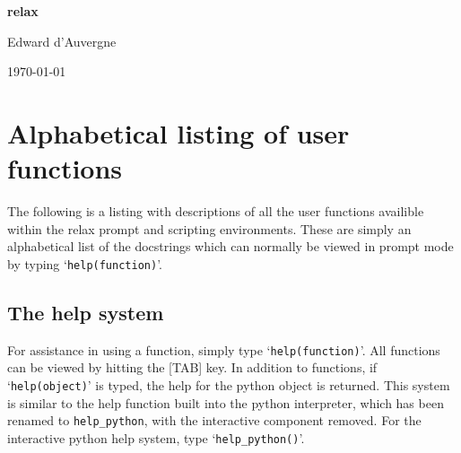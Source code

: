 \documentclass[a4paper, 11pt, twoside, openright]{book}
\begin{document}

\begin{titlepage}
\begin{center}


{\huge \textbf{relax}}


{\Large Edward d'Auvergne}


{\large \today}


\end{center}
\end{titlepage}



\tableofcontents




\chapter{Alphabetical listing of user functions}

The following is a listing with descriptions of all the user functions availible within the relax prompt and scripting environments.  These are simply an alphabetical list of the docstrings which can normally be viewed in prompt mode by typing `\texttt{help(function)}'.



\section{The help system}

For assistance in using a function, simply type `\texttt{help(function)}'.  All functions can be viewed by hitting the [TAB] key.  In addition to functions, if `\texttt{help(object)}' is typed, the help for the python object is returned.  This system is similar to the help function built into the python interpreter, which has been renamed to \texttt{help\_python}, with the interactive component removed.  For the interactive python help system, type `\texttt{help\_python()}'.
\end{document}
